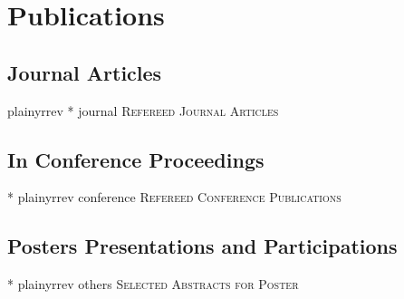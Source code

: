 \documentclass[11pt,a4paper,sans]{moderncv} %
\begin{document}
\section{Publications}

\subsection{Journal Articles}
{plainyrrev}
\nocite{journal}{*}
{journal}
{\large \textsc{Refereed Journal Articles}}



\subsection{In Conference Proceedings}
\nocite{conference}{*}
{plainyrrev}
{conference}
{\large \textsc{Refereed Conference Publications}}

\subsection{Posters Presentations and Participations}
\nocite{others}{*}
{plainyrrev}
{others}
{\large \textsc{Selected Abstracts for Poster}}
\end{document}
